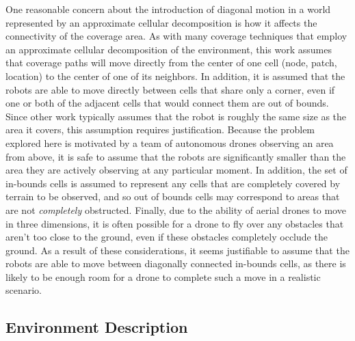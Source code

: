 One reasonable concern about the introduction of diagonal motion in a world represented by an approximate cellular decomposition is how it affects the connectivity of the coverage area. As with many coverage techniques that employ an approximate cellular decomposition of the environment, this work assumes that coverage paths will move directly from the center of one cell (node, patch, location) to the center of one of its neighbors. In addition, it is assumed that the robots are able to move directly between cells that share only a corner, even if one or both of the adjacent cells that would connect them are out of bounds. Since other work typically assumes that the robot is roughly the same size as the area it covers, this assumption requires justification. Because the problem explored here is motivated by a team of autonomous drones observing an area from above, it is safe to assume that the robots are significantly smaller than the area they are actively observing at any particular moment. In addition, the set of in-bounds cells is assumed to represent any cells that are completely covered by terrain to be observed, and so out of bounds cells may correspond to areas that are not \textit{completely} obstructed. Finally, due to the ability of aerial drones to move in three dimensions, it is often possible for a drone to fly over any obstacles that aren't too close to the ground, even if these obstacles completely occlude the ground. As a result of these considerations, it seems justifiable to assume that the robots are able to move between diagonally connected in-bounds cells, as there is likely to be enough room for a drone to complete such a move in a realistic scenario.


\subsection{Environment Description}


